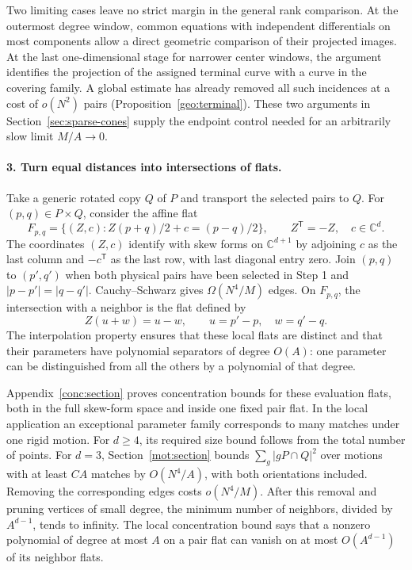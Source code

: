 Two limiting cases leave no strict margin in the general rank
comparison. At the outermost degree window, common equations with
independent differentials on most components allow a direct geometric
comparison of their projected images. At the last one-dimensional
stage for narrower center windows, the argument identifies the projection
of the assigned terminal curve with a curve in the covering family.
A global estimate has already removed all such incidences at a
cost of \(o(N^2)\) pairs (Proposition~\ref{geo:terminal}). These two
arguments in Section~\ref{sec:sparse-cones} supply the endpoint
control needed for an arbitrarily slow limit \(M/A\to0\).

\paragraph{3. Turn equal distances into intersections of flats.}
Take a generic rotated copy \(Q\) of \(P\) and transport the selected
pairs to \(Q\). For \((p,q)\in P\times Q\),
consider the affine flat
\[
 F_{p,q}=\{(Z,c):Z(p+q)/2+c=(p-q)/2\},
 \qquad Z^{\mathsf T}=-Z,\quad c\in\mathbb C^d.
\]
The coordinates \((Z,c)\) identify with skew forms on
\(\mathbb C^{d+1}\) by adjoining \(c\) as the last column and
\(-c^{\mathsf T}\) as the last row, with last diagonal entry zero.
Join \((p,q)\) to \((p',q')\)
when both physical pairs have been selected in Step 1 and
\(|p-p'|=|q-q'|\). Cauchy--Schwarz gives
\(\Omega(N^4/M)\) edges. On \(F_{p,q}\), the intersection with a
neighbor is the flat defined by
\[
 Z(u+w)=u-w,\qquad u=p'-p,\quad w=q'-q.
\]
The interpolation property ensures that these local flats are
distinct and that their parameters have polynomial separators of
degree \(O(A)\): one parameter can be distinguished from all the
others by a polynomial of that degree.

Appendix~\ref{conc:section} proves concentration bounds for these
evaluation flats, both in the full skew-form space and inside one
fixed pair flat. In the local application an exceptional parameter
family corresponds to many matches under one rigid motion. For
\(d\ge4\), its required size bound follows from the total number of
points. For \(d=3\), Section~\ref{mot:section} bounds
\(\sum_g |gP\cap Q|^2\) over motions with at least \(CA\) matches
by \(O(N^4/A)\), with both orientations included. Removing the
corresponding edges costs \(o(N^4/M)\). After this removal and
pruning vertices of small degree, the minimum number of neighbors,
divided by \(A^{d-1}\), tends to infinity.
The local concentration bound says that
a nonzero polynomial of degree at most \(A\) on a pair flat can
vanish on at most \(O(A^{d-1})\) of its neighbor flats.

